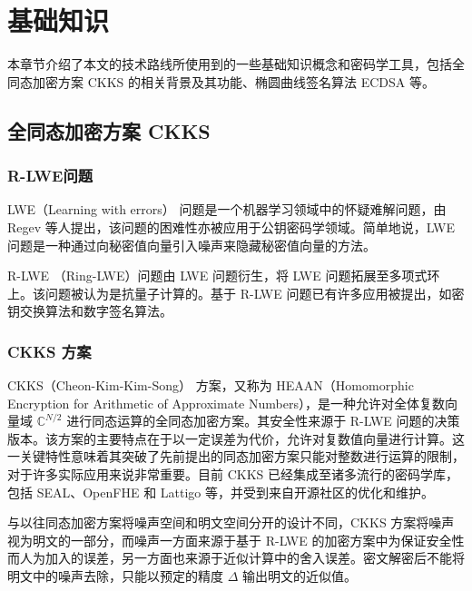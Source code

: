\chapter{基础知识}

本章节介绍了本文的技术路线所使用到的一些基础知识概念和密码学工具，包括全同态加密方案 CKKS 的相关背景及其功能、椭圆曲线签名算法 ECDSA 等。

\section{全同态加密方案 CKKS}

\subsection{R-LWE问题}

LWE（Learning with errors） 问题是一个机器学习领域中的怀疑难解问题，由 Regev 等人提出\cite{10.1145/1568318.1568324}，该问题的困难性亦被应用于公钥密码学领域。简单地说，LWE 问题是一种通过向秘密值向量引入噪声来隐藏秘密值向量的方法。


R-LWE （Ring-LWE）问题由 LWE 问题衍生，将 LWE 问题拓展至多项式环上。该问题被认为是抗量子计算的。基于 R-LWE 问题已有许多应用被提出，如密钥交换算法\cite{cryptoeprint:2012/688}和数字签名算法\cite{cryptoeprint:2011/537}。


\subsection{CKKS 方案} \label{sec:CKKS_Review}

CKKS（Cheon-Kim-Kim-Song） 方案，又称为 HEAAN（Homomorphic Encryption for Arithmetic of Approximate Numbers），是一种允许对全体复数向量域 $\mathbb{C}^{N/2}$ 进行同态运算的全同态加密方案。其安全性来源于 R-LWE 问题的决策版本。该方案的主要特点在于以一定误差为代价，允许对复数值向量进行计算。这一关键特性意味着其突破了先前提出的同态加密方案只能对整数进行运算的限制，对于许多实际应用来说非常重要。目前 CKKS 已经集成至诸多流行的密码学库，包括 SEAL、OpenFHE 和 Lattigo 等\cite{sealcrypto,OpenFHE,Mouchet2020LattigoAM}，并受到来自开源社区的优化和维护。

与以往同态加密方案将噪声空间和明文空间分开的设计不同，CKKS 方案将噪声视为明文的一部分，而噪声一方面来源于基于 R-LWE 的加密方案中为保证安全性而人为加入的误差，另一方面也来源于近似计算中的舍入误差。密文解密后不能将明文中的噪声去除，只能以预定的精度 $\Delta$ 输出明文的近似值。\cite{CKKS_optimize}

